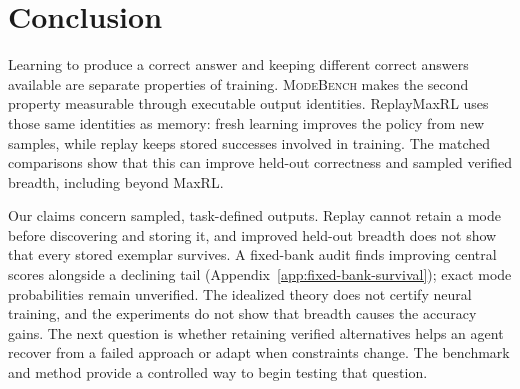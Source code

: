 \documentclass{article}
\newcommand{\1}{\mathbf 1}
\newcommand{\mb}{\textsc{ModeBench}}
\theoremstyle{remark}
\theoremstyle{definition}
\theoremstyle{plain}
\begin{document}
\section{Conclusion}
\label{sec:conclusion}
\label{sec:discussion}
\label{sec:limitations}

Learning to produce a correct answer and keeping different correct answers
available are separate properties of training. \mb{} makes the second
property measurable through executable output identities. ReplayMaxRL uses
those same identities as memory: fresh learning improves the policy from new
samples, while replay keeps stored successes involved in training. The matched
comparisons show that this can improve held-out correctness and sampled
verified breadth, including beyond MaxRL.

Our claims concern sampled, task-defined outputs. Replay cannot retain a mode
before discovering and storing it, and improved held-out breadth does not
show that every stored exemplar survives. A fixed-bank audit finds improving
central scores alongside a declining tail
(Appendix~\ref{app:fixed-bank-survival}); exact mode probabilities remain
unverified. The idealized theory does not certify neural training, and the
experiments do not show that breadth causes the accuracy gains. The next
question is whether retaining verified alternatives helps an agent recover
from a failed approach or adapt when constraints change. The benchmark and
method provide a controlled way to begin testing that question.
\label{sec:main-end}

\clearpage
{}\label{sec:references}



\long{}
\end{document}
